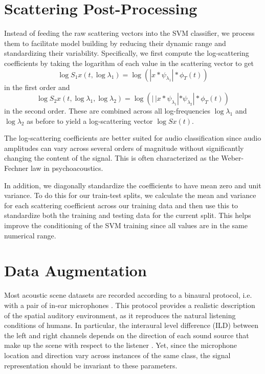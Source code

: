\documentclass{article}
\newcommand{\lau}{{\lambda_1}}
\newcommand{\lad}{{\lambda_2}}
\begin{document}
\begin{sloppy}
\section{Scattering Post-Processing}
\label{sec:post}

Instead of feeding the raw scattering vectors into the SVM classifier, we process them to facilitate model building by reducing their dynamic range and standardizing their variability. Specifically, we first compute the log-scattering coefficients by taking the logarithm of each value in the scattering vector to get
\begin{equation}
	\log S_1 x(t, \log \lau) = \log \left( | x \ast \psi_\lau | \ast \phi_T(t) \right)
\end{equation}
in the first order and
\begin{equation}
	\log S_2 x(t, \log \lau, \log \lad) = \log \left( |\,| x \ast \psi_\lau | \ast \psi_\lad | \ast \phi_T(t) \right)
\end{equation}
in the second order. These are combined across all log-frequencies $\log \lau$ and $\log \lad$ as before to yield a log-scattering vector $\log Sx(t)$.

The log-scattering coefficients are better suited for audio classification since audio amplitudes can vary across several orders of magnitude without significantly changing the content of the signal. This is often characterized as the Weber-Fechner law in psychoacoustics.

In addition, we diagonally standardize the coefficients to have mean zero and unit variance. To do this for our train-test splits, we calculate the mean and variance for each scattering coefficient across our training data and then use this to standardize both the training and testing data for the current split. This helps improve the conditioning of the SVM training since all values are in the same numerical range.

\section{Data Augmentation}
\label{sec:augment}

Most acoustic scene datasets are recorded according to a binaural protocol, i.e. with a pair of in-ear microphones \cite{Wang2006}. This protocol provides a realistic description of the spatial auditory environment, as it reproduces the natural listening conditions of humans. In particular, the interaural level difference (ILD) between the left and right channels depends on the direction of each sound source that make up the scene with respect to the listener \cite{Blauert2004}. Yet, since the microphone location and direction vary across instances of the same class, the signal representation should be invariant to these parameters.


\end{sloppy}
\end{document}

